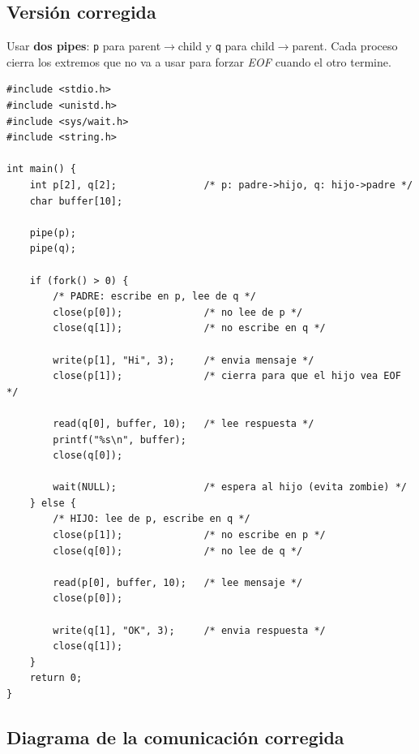 \documentclass[11pt,a4paper]{article}
\begin{document}
\subsection*{Versión corregida}

Usar \textbf{dos pipes}: \texttt{p} para parent$\to$child y
\texttt{q} para child$\to$parent. Cada proceso cierra los extremos
que no va a usar para forzar \emph{EOF} cuando el otro termine.

\begin{lstlisting}[style=cstyle]
#include <stdio.h>
#include <unistd.h>
#include <sys/wait.h>
#include <string.h>

int main() {
    int p[2], q[2];               /* p: padre->hijo, q: hijo->padre */
    char buffer[10];

    pipe(p);
    pipe(q);

    if (fork() > 0) {
        /* PADRE: escribe en p, lee de q */
        close(p[0]);              /* no lee de p */
        close(q[1]);              /* no escribe en q */

        write(p[1], "Hi", 3);     /* envia mensaje */
        close(p[1]);              /* cierra para que el hijo vea EOF */

        read(q[0], buffer, 10);   /* lee respuesta */
        printf("%s\n", buffer);
        close(q[0]);

        wait(NULL);               /* espera al hijo (evita zombie) */
    } else {
        /* HIJO: lee de p, escribe en q */
        close(p[1]);              /* no escribe en p */
        close(q[0]);              /* no lee de q */

        read(p[0], buffer, 10);   /* lee mensaje */
        close(p[0]);

        write(q[1], "OK", 3);     /* envia respuesta */
        close(q[1]);
    }
    return 0;
}
\end{lstlisting}

\subsection*{Diagrama de la comunicación corregida}

\begin{center}
\end{center}
\end{document}
